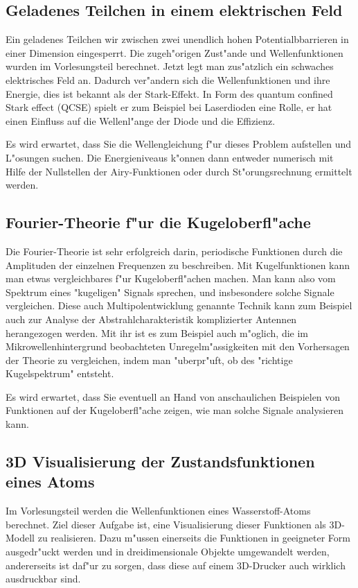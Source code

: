 \subsection{Geladenes Teilchen in einem elektrischen Feld}
Ein geladenes Teilchen wir zwischen zwei unendlich hohen
Potentialbbarrieren in einer Dimension eingesperrt. Die zugeh"origen
Zust"ande und Wellenfunktionen wurden im Vorlesungsteil berechnet.
Jetzt legt man zus"atzlich ein schwaches elektrisches Feld an. Dadurch
ver"andern sich die Wellenfunktionen und ihre Energie, dies ist
bekannt als der Stark-Effekt. In Form des quantum confined Stark
effect (QCSE) spielt er zum Beispiel bei Laserdioden eine Rolle,
er hat einen Einfluss auf die Wellenl"ange der Diode und die Effizienz.

Es wird erwartet, dass Sie die Wellengleichung f"ur dieses Problem
aufstellen und L"osungen suchen. Die Energieniveaus k"onnen dann
entweder numerisch mit Hilfe der Nullstellen der Airy-Funktionen
oder durch St"orungsrechnung ermittelt werden.

\subsection{Fourier-Theorie f"ur die Kugeloberfl"ache}
Die Fourier-Theorie ist sehr erfolgreich darin, periodische Funktionen
durch die Amplituden der einzelnen Frequenzen zu beschreiben. Mit
Kugelfunktionen kann man etwas vergleichbares f"ur Kugeloberfl"achen
machen. Man kann also vom Spektrum eines "kugeligen" Signals sprechen,
und insbesondere solche Signale vergleichen. Diese auch Multipolentwicklung
genannte Technik kann zum Beispiel auch zur Analyse der
Abstrahlcharakteristik komplizierter Antennen herangezogen werden.
Mit ihr ist es zum Beispiel auch m"oglich, die im Mikrowellenhintergrund
beobachteten Unregelm"assigkeiten mit den Vorhersagen der Theorie
zu vergleichen, indem man "uberpr"uft, ob des "richtige Kugelspektrum"
entsteht.

Es wird erwartet, dass Sie eventuell an Hand von anschaulichen
Beispielen von Funktionen auf der Kugeloberfl"ache zeigen, wie man
solche Signale analysieren kann.

\subsection{3D Visualisierung der Zustandsfunktionen eines Atoms}
Im Vorlesungsteil werden die Wellenfunktionen eines Wasserstoff-Atoms
berechnet. Ziel dieser Aufgabe ist, eine Visualisierung dieser
Funktionen als 3D-Modell zu realisieren. Dazu m"ussen einerseits die
Funktionen in geeigneter Form ausgedr"uckt werden und in dreidimensionale
Objekte umgewandelt werden, andererseits ist daf"ur zu sorgen, dass
diese auf einem 3D-Drucker auch wirklich ausdruckbar sind.

